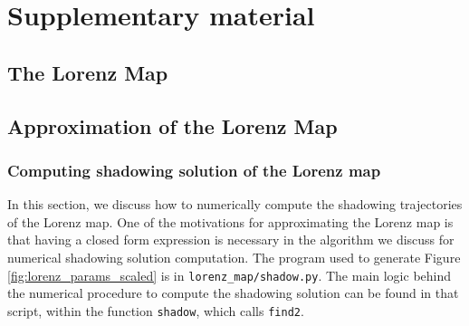 \section{Supplementary material}
\subsection{The Lorenz Map}
\subsection{Approximation of the Lorenz Map}

\subsubsection{Computing shadowing solution of the Lorenz map}
In this section, we discuss how to numerically compute the shadowing trajectories of the Lorenz map. One of the motivations for approximating the Lorenz map is that having a closed form expression is necessary in the algorithm we discuss for numerical shadowing solution computation. The program used to generate Figure 
\ref{fig:lorenz_params_scaled} is in \verb+lorenz_map/shadow.py+. The main logic behind the numerical procedure to compute the shadowing solution can be found in that script, within the function \verb+shadow+, which calls \verb+find2+. 